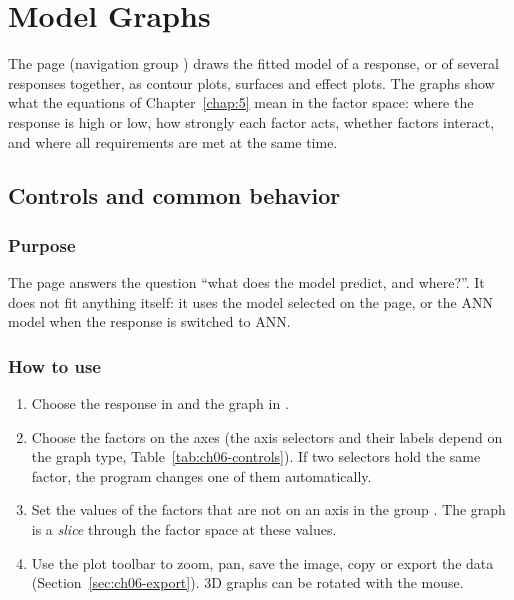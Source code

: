 \chapter{Model Graphs}\label{sec:ch06-graphs}\label{chap:6}

The  page (navigation group ) draws the fitted model of a response, or of
several responses together, as contour plots, surfaces and effect plots. The graphs show what the
equations of Chapter~\ref{chap:5} mean in the factor space: where the response is high or low, how strongly each
factor acts, whether factors interact, and where all requirements are met at the same time.

\section{Controls and common behavior}\label{sec:ch06-controls}

\subsection*{Purpose}
The page answers the question ``what does the model predict, and where?''. It does not fit anything
itself: it uses the model selected on the  page, or the ANN model when the response is
switched to ANN.

\subsection*{How to use}
\begin{enumerate}
  \item Choose the response in  and the graph in .
  \item Choose the factors on the axes (the axis selectors and their labels depend on the graph type,
        Table~\ref{tab:ch06-controls}). If two selectors hold the same factor, the program changes one of
        them automatically.
  \item Set the values of the factors that are not on an axis in the group . The
        graph is a \emph{slice} through the factor space at these values.
  \item Use the plot toolbar to zoom, pan, save the image, copy or export the data
        (Section~\ref{sec:ch06-export}). 3D graphs can be rotated with the mouse.
\end{enumerate}

